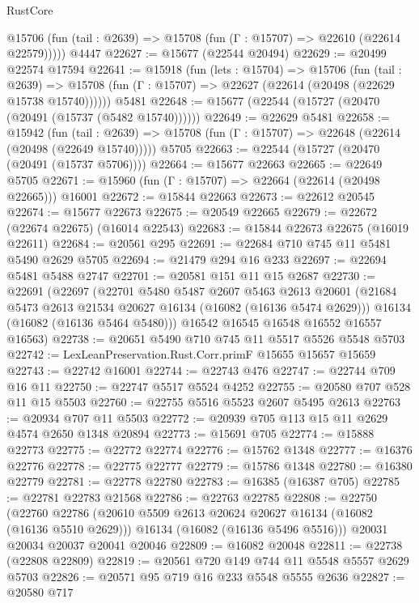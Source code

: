 \begin{lexlean}{RustCore}
\begin{coremodule}
      @15706 (fun (tail : @2639) => @15708 (fun (Γ : @15707) => @22610 (@22614 @22579)))))
    @4447
@22627 := @15677 (@22544 @20494)
@22629 := @20499 @22574 @17594
@22641 := @15918
    (fun (lets : @15704) =>
    @15706
      (fun (tail : @2639) =>
      @15708 (fun (Γ : @15707) => @22627 (@22614 (@20498 (@22629 @15738 @15740))))))
    @5481
@22648 := @15677 (@22544 (@15727 (@20470 (@20491 (@15737 (@5482 @15740))))))
@22649 := @22629 @5481
@22658 := @15942
    (fun (tail : @2639) => @15708 (fun (Γ : @15707) => @22648 (@22614 (@20498 (@22649 @15740)))))
    @5705
@22663 := @22544 (@15727 (@20470 (@20491 (@15737 @5706))))
@22664 := @15677 @22663
@22665 := @22649 @5705
@22671 := @15960 (fun (Γ : @15707) => @22664 (@22614 (@20498 @22665))) @16001
@22672 := @15844 @22663
@22673 := @22612 @20545
@22674 := @15677 @22673
@22675 := @20549 @22665
@22679 := @22672 (@22674 @22675) (@16014 @22543)
@22683 := @15844 @22673 @22675 (@16019 @22611)
@22684 := @20561 @295
@22691 := @22684 @710 @745 @11 @5481 @5490 @2629 @5705
@22694 := @21479 @294 @16 @233
@22697 := @22694 @5481 @5488 @2747
@22701 := @20581 @151 @11 @15 @2687
@22730 := @22691
    (@22697
      (@22701
        @5480
        @5487
        @2607
        @5463
        @2613
        @20601
        (@21684 @5473 @2613 @21534 @20627 @16134 (@16082 (@16136 @5474 @2629)))
        @16134
        (@16082 (@16136 @5464 @5480)))
      @16542
      @16545
      @16548
      @16552
      @16557
      @16563)
@22738 := @20651 @5490 @710 @745 @11 @5517 @5526 @5548 @5703
@22742 := LexLeanPreservation.Rust.Corr.primF @15655 @15657 @15659
@22743 := @22742 @16001
@22744 := @22743 @476
@22747 := @22744 @709 @16 @11
@22750 := @22747 @5517 @5524 @4252
@22755 := @20580 @707 @528 @11 @15 @5503
@22760 := @22755 @5516 @5523 @2607 @5495 @2613
@22763 := @20934 @707 @11 @5503
@22772 := @20939 @705 @113 @15 @11 @2629 @4574 @2650 @1348 @20894
@22773 := @15691 @705
@22774 := @15888 @22773
@22775 := @22772 @22774
@22776 := @15762 @1348
@22777 := @16376 @22776
@22778 := @22775 @22777
@22779 := @15786 @1348
@22780 := @16380 @22779
@22781 := @22778 @22780
@22783 := @16385 (@16387 @705)
@22785 := @22781 @22783 @21568
@22786 := @22763 @22785
@22808 := @22750
    (@22760
      @22786
      (@20610 @5509 @2613 @20624 @20627 @16134 (@16082 (@16136 @5510 @2629)))
      @16134
      (@16082 (@16136 @5496 @5516)))
    @20031
    @20034
    @20037
    @20041
    @20046
@22809 := @16082 @20048
@22811 := @22738 (@22808 @22809)
@22819 := @20561 @720 @149 @744 @11 @5548 @5557 @2629 @5703
@22826 := @20571 @95 @719 @16 @233 @5548 @5555 @2636
@22827 := @20580 @717

\end{coremodule}
\end{lexlean}
